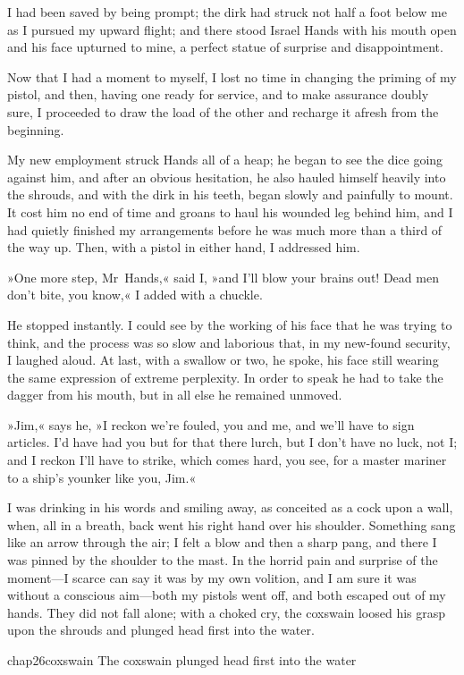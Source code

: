 I had been saved by being prompt; the dirk had struck not half a foot below me as I pursued my upward flight; and there stood Israel Hands with his mouth open and his face upturned to mine, a perfect statue of surprise and disappointment.

Now that I had a moment to myself, I lost no time in changing the priming of my pistol, and then, having one ready for service, and to make assurance doubly sure, I proceeded to draw the load of the other and recharge it afresh from the beginning.

My new employment struck Hands all of a heap; he began to see the dice going against him, and after an obvious hesitation, he also hauled himself heavily into the shrouds, and with the dirk in his teeth, began slowly and painfully to mount. It cost him no end of time and groans to haul his wounded leg behind him, and I had quietly finished my arrangements before he was much more than a third of the way up. Then, with a pistol in either hand, I addressed him.

»One more step, Mr~Hands,« said I, »and I'll blow your brains out! Dead men don't bite, you know,« I added with a chuckle.

He stopped instantly. I could see by the working of his face that he was trying to think, and the process was so slow and laborious that, in my new-found security, I laughed aloud. At last, with a swallow or two, he spoke, his face still wearing the same expression of extreme perplexity. In order to speak he had to take the dagger from his mouth, but in all else he remained unmoved.

»Jim,« says he, »I reckon we're fouled, you and me, and we'll have to sign articles. I'd have had you but for that there lurch, but I don't have no luck, not I; and I reckon I'll have to strike, which comes hard, you see, for a master mariner to a ship's younker like you, Jim.«

I was drinking in his words and smiling away, as conceited as a cock upon a wall, when, all in a breath, back went his right hand over his shoulder. Something sang like an arrow through the air; I felt a blow and then a sharp pang, and there I was pinned by the shoulder to the mast. In the horrid pain and surprise of the moment—I scarce can say it was by my own volition, and I am sure it was without a conscious aim—both my pistols went off, and both escaped out of my hands. They did not fall alone; with a choked cry, the coxswain loosed his grasp upon the shrouds and plunged head first into the water.

\begin{colorbigpic}
	[\picsize]
	{chap26coxswain}
	{The coxswain plunged head first into the water}
\end{colorbigpic}